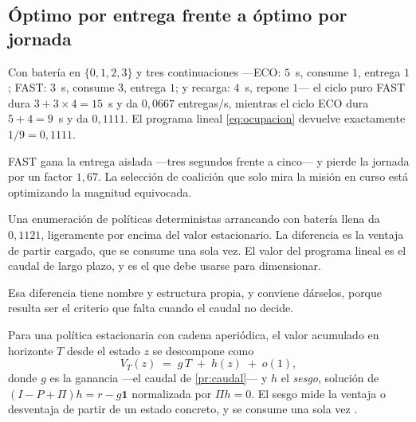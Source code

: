 \subsection{Óptimo por entrega frente a óptimo por jornada}

\begin{observacion}
\label{obs:eco-fast}
Con batería en $\{0,1,2,3\}$ y tres continuaciones —\textsf{ECO}: $5$~s, consume
$1$, entrega $1$; \textsf{FAST}: $3$~s, consume $3$, entrega $1$; y recarga:
$4$~s, repone $1$— el ciclo puro \textsf{FAST} dura $3+3\times4=15$~s y da
$0{,}0667$ entregas/s, mientras el ciclo \textsf{ECO} dura $5+4=9$~s y da
$0{,}1111$. El programa lineal \eqref{eq:ocupacion} devuelve exactamente
$1/9=0{,}1111$.

\textsf{FAST} gana la entrega aislada —tres segundos frente a cinco— y pierde la
jornada por un factor $1{,}67$. La selección de coalición que solo mira la
misión en curso está optimizando la magnitud equivocada.
\end{observacion}

\begin{observacion}
\label{obs:transitorio}
Una enumeración de políticas deterministas arrancando con batería llena da
$0{,}1121$, ligeramente por encima del valor estacionario. La diferencia es la
ventaja de partir cargado, que se consume una sola vez. El valor del programa
lineal es el caudal de largo plazo, y es el que debe usarse para dimensionar.
\end{observacion}

Esa diferencia tiene nombre y estructura propia, y conviene dárselos, porque
resulta ser el criterio que falta cuando el caudal no decide.

\begin{proposicion}
\label{pr:sesgo}
Para una política estacionaria con cadena aperiódica, el valor acumulado en
horizonte $T$ desde el estado $z$ se descompone como
\[
  V_T(z)\;=\;g\,T\;+\;h(z)\;+\;o(1),
\]
donde $g$ es la ganancia —el caudal de \cref{pr:caudal}— y $h$ el \emph{sesgo},
solución de $(I-P+\Pi)h=r-g\mathbf 1$ normalizada por $\Pi h=0$. El sesgo mide la
ventaja o desventaja de partir de un estado concreto, y se consume una sola vez
\cite{lozovanu2024positional}.
\end{proposicion}

